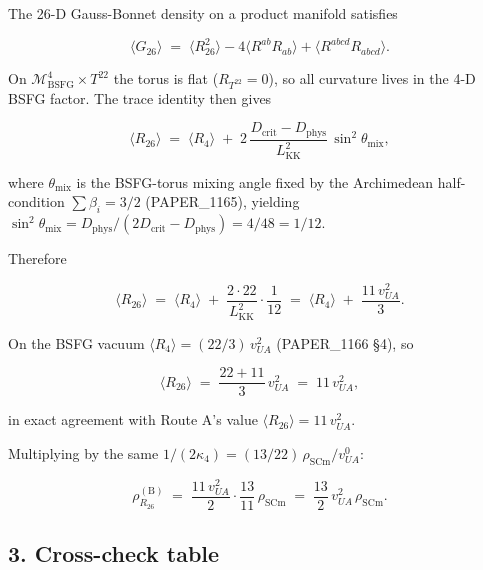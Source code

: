 \documentclass[
]{article}
\begin{document}
The 26-D Gauss-Bonnet density on a product manifold satisfies

\[
\langle G_{26}\rangle
\;=\; \langle R_{26}^{2}\rangle - 4\langle R^{ab}R_{ab}\rangle
   + \langle R^{abcd}R_{abcd}\rangle.
\]

On \(\mathcal{M}^{4}_{\mathrm{BSFG}}\times T^{22}\) the torus is flat
(\(R_{T^{22}}=0\)), so all curvature lives in the 4-D BSFG factor. The
trace identity then gives

\[
\langle R_{26}\rangle
\;=\; \langle R_{4}\rangle
\;+\; 2\,\frac{D_{\mathrm{crit}}-D_{\mathrm{phys}}}{L_{\mathrm{KK}}^{2}}\,\sin^{2}\!\theta_{\mathrm{mix}},
\]

where \(\theta_{\mathrm{mix}}\) is the BSFG-torus mixing angle fixed by
the Archimedean half-condition \(\sum\beta_{i}=3/2\) (PAPER\_1165),
yielding
\(\sin^{2}\theta_{\mathrm{mix}} = D_{\mathrm{phys}}/(2D_{\mathrm{crit}}-D_{\mathrm{phys}})
= 4/48 = 1/12\).

Therefore

\[
\langle R_{26}\rangle
\;=\; \langle R_{4}\rangle \;+\; \frac{2\cdot 22}{L_{\mathrm{KK}}^{2}}\cdot\frac{1}{12}
\;=\; \langle R_{4}\rangle \;+\; \frac{11\,v_{UA}^{2}}{3}.
\]

On the BSFG vacuum \(\langle R_{4}\rangle = (22/3)\,v_{UA}^{2}\)
(PAPER\_1166 §4), so

\[
\langle R_{26}\rangle \;=\; \frac{22 + 11}{3}\,v_{UA}^{2}
\;=\; 11\,v_{UA}^{2},
\]

in exact agreement with Route A's value
\(\langle R_{26}\rangle = 11\,v_{UA}^{2}\).

Multiplying by the same
\(1/(2\kappa_4) = (13/22)\,\rho_{\mathrm{SCm}}/v_{UA}^{0}\):

\[
\rho_{R_{26}}^{(\mathrm{B})}
\;=\; \frac{11\,v_{UA}^{2}}{2}\cdot\frac{13}{11}\,\rho_{\mathrm{SCm}}
\;=\; \frac{13}{2}\,v_{UA}^{2}\,\rho_{\mathrm{SCm}}.
\]

\subsection{3. Cross-check table}\label{cross-check-table}
\end{document}
